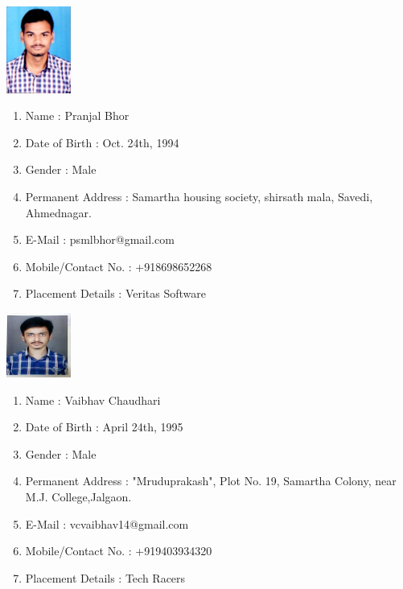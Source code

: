\documentclass[oneside,a4paper,12pt]{book}
\begin{document}
\begin{appendices}
\begin{center}
\includegraphics[width=60pt]{pranjal.jpg}
\end{center}
\begin{enumerate}
\item[] Name :  Pranjal Bhor\hspace{90 mm}
\item[] Date of Birth : Oct. 24th, 1994
\item[] Gender : Male
\item[] Permanent Address : Samartha housing society, shirsath mala, Savedi, Ahmednagar.
\item[] E-Mail : psmlbhor@gmail.com	
\item[] Mobile/Contact No. : +918698652268
\item[] Placement Details : Veritas Software
\end{enumerate}

\newpage

\begin{center}
	\includegraphics[width=60pt]{vaibhav.jpg}
\end{center}
\begin{enumerate}
	\item[] Name :  Vaibhav Chaudhari\hspace{90 mm}
	\item[] Date of Birth : April 24th, 1995
	\item[] Gender : Male
	\item[] Permanent Address : "Mruduprakash", Plot No. 19, Samartha Colony, near M.J. College,Jalgaon.
	\item[] E-Mail : vcvaibhav14@gmail.com	
	\item[] Mobile/Contact No. : +919403934320
	\item[] Placement Details : Tech Racers
\end{enumerate}

\newpage


\end{appendices}
\end{document}
